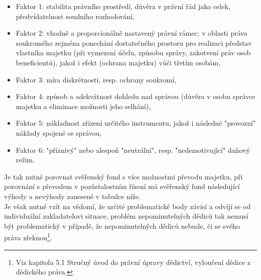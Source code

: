 \documentclass{article}
\begin{document}
\begin{itemize}
	\item Faktor 1: stabilita právního prostředí, důvěra v právní řád jako celek, předvídatelnost soudního rozhodování,
	\item Faktor 2: vhodně a proporcionálně nastavený právní rámec; v oblasti práva soukromého zejména ponechání dostatečného prostoru pro realizaci představ vlastníka majetku (při vymezení účelu, způsobu správy, zakotvení práv osob beneficientů), jakož i efekt (ochrana majetku) vůči třetím osobám,
	\item Faktor 3: míra diskrétnosti, resp. ochrany soukromí,
	\item Faktor 4: způsob a adekvátnost dohledu nad správou (důvěra v osobu správce majetku a eliminace možnosti jeho selhání),
	\item Faktor 5: nákladnost zřízení určitého instrumentu, jakož i následné "provozní" náklady spojené se správou,
	\item Faktor 6: "příznivý" nebo alespoň "neutrální", resp. "nedemotivující" daňový režim.
\end{itemize}




Je tak nutné porovnat svěřenský fond s více možnostmi převodu majetku, při porovnání s převodem v pozůstalostním řízení má svěřenský fond následující výhody a nevýhody zanesené v tabulce níže.\\

Je však nutné vzít na vědomí, že určité problematické body závisí a odvíjí se od individuální zakladatelovi situace, problém nepominutelných dědiců tak nemusí být problematický v případě, že nepominutelných dědiců nebude, či se svého práva zřeknou\footnote{Viz kapitola 5.1 Stručný úvod do právní úpravy dědictví, vyloučení dědice z dědického práva.}.\\
\end{document}

